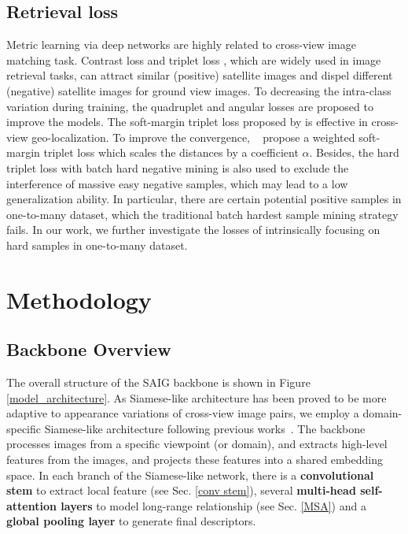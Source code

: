 \documentclass[sn-basic,iicol]{sn-jnl}
\theoremstyle{thmstyletwo}\newtheorem{example}{Example}\newtheorem{remark}{Remark}
\theoremstyle{thmstylethree}\newtheorem{definition}{Definition}
\begin{document}
\subsection{Retrieval loss}
Metric learning via deep networks are highly related to cross-view image matching task. Contrast loss \citep{varior2016gated} and triplet loss \citep{schroff2015facenet}, which are widely used in image retrieval tasks, can attract similar (positive) satellite images and dispel different (negative) satellite images for ground view images. To decreasing the intra-class variation during training, the quadruplet \citep{chen2017beyond} and angular losses \citep{wang2017deep} are proposed to improve the models. The soft-margin triplet loss proposed by \cite{vo2016localizing} is effective in cross-view geo-localization. To improve the convergence, ~\cite{hu2018cvm} propose a weighted soft-margin triplet loss which scales the distances by a coefficient $\alpha$. Besides, the hard triplet loss with batch hard negative mining \citep{hermans2017defense} is also used to exclude the interference of massive easy negative samples, which may lead to a low generalization ability. In particular, there are certain potential positive samples in one-to-many dataset, which the traditional batch hardest sample mining strategy fails. In our work, we further investigate the losses of intrinsically focusing on hard samples in one-to-many dataset. 


\section{Methodology}\label{sec3}
















 




\subsection{Backbone Overview}\label{overview}
The overall structure of the SAIG backbone is shown in Figure \ref{model_architecture}. As Siamese-like architecture has been proved to be more adaptive to appearance variations of cross-view image pairs, we employ a domain-specific Siamese-like architecture following previous works~\citep{hu2018cvm, SAFA2019,liu2019lending,CVFT2020}.
The backbone processes images from a specific viewpoint (or domain), and extracts high-level features from the images, and projects these features into a shared embedding space. 
In each branch of the Siamese-like network, there is a {\bf convolutional stem} to extract local feature (see Sec. \ref{conv stem}), several {\bf multi-head self-attention layers} to model long-range relationship (see Sec. \ref{MSA}) and a {\bf global pooling layer} to generate final descriptors. 
\end{document}
